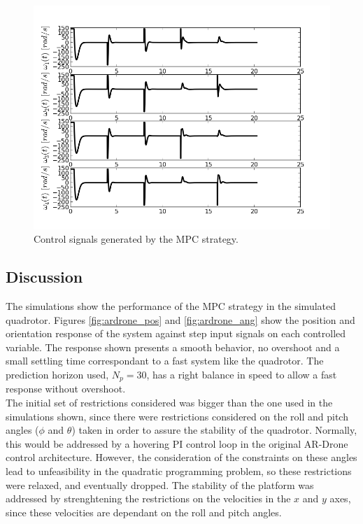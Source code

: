 \begin{figure}[H]
\centering
\includegraphics[scale=0.7]{Images/Chapter5/ardrone/control_signals.png}
\caption{Control signals generated by the MPC strategy.}
\label{fig:ardrone_inputs}
\end{figure}

\subsection{Discussion}

The simulations show the performance of the MPC strategy in the simulated quadrotor. Figures \ref{fig:ardrone_pos} and \ref{fig:ardrone_ang} show the position and orientation  response of the system against step input signals on each controlled variable. The response shown presents a smooth behavior, no overshoot and a small settling time correspondant to a fast system like the quadrotor. The prediction horizon used, $N_p = 30$, has a right balance in speed to allow a fast response without overshoot.\\

The initial set of restrictions considered was bigger than the one used in the simulations shown, since there were restrictions considered on the roll and pitch angles ($\phi$ and $\theta$) taken in order to assure the stability of the quadrotor. Normally, this would be addressed by a hovering PI control loop in the original AR-Drone control architecture. However, the consideration of the constraints on these angles lead to unfeasibility in the quadratic programming problem, so  these restrictions were relaxed, and eventually dropped. The stability of the platform was addressed by strenghtening the restrictions on the velocities in the $x$ and $y$ axes, since these velocities are dependant on the roll and pitch angles. \\

